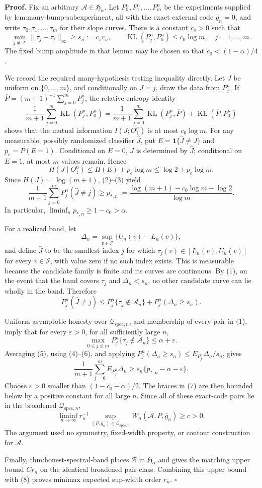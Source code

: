 \textbf{Proof.}
Fix an arbitrary \(\mathcal A\in\mathfrak H_\alpha\).  Let \(P_0^n,P_1^n,\ldots,P_m^n\) be the experiments supplied by \(\text{lem:many-bump-subexperiment}\), all with the exact external code \(\bar g_n=0\), and write \(\tau_0,\tau_1,\ldots,\tau_m\) for their slope curves.  There is a constant \(c_s>0\) such that
\[
 \min_{j\ne\ell}\|\tau_j-\tau_\ell\|_\infty
 \ge s_n:=c_sr_n, \qquad
 \operatorname{KL}(P_j^n,P_0^n)\le c_0\log m,
 \quad j=1,\ldots,m. \tag{1}
\]
The fixed bump amplitude in that lemma may be chosen so that \(c_0<(1-\alpha)/4\).

We record the required many-hypothesis testing inequality directly.  Let \(J\) be uniform on \(\{0,\ldots,m\}\), and conditionally on \(J=j\), draw the data from \(P_j^n\).  If \(\overline P=(m+1)^{-1}\sum_{j=0}^mP_j^n\), the relative-entropy identity
\[
 \frac1{m+1}\sum_{j=0}^m\operatorname{KL}(P_j^n,P_0^n)
 =\frac1{m+1}\sum_{j=0}^m\operatorname{KL}(P_j^n,\overline P)
 +\operatorname{KL}(\overline P,P_0^n) \tag{2}
\]
shows that the mutual information \(I(J;O_1^n)\) is at most \(c_0\log m\).  For any measurable, possibly randomized classifier \(\widehat J\), put \(E=\mathbf 1\{\widehat J\ne J\}\) and \(p_e=P(E=1)\).  Conditional on \(E=0\), \(J\) is determined by \(\widehat J\); conditional on \(E=1\), at most \(m\) values remain.  Hence
\[
 H(J\mid O_1^n)
 \le H(E)+p_e\log m
 \le\log2+p_e\log m. \tag{3}
\]
Since \(H(J)=\log(m+1)\), (2)--(3) yield
\[
 \frac1{m+1}\sum_{j=0}^mP_j^n(\widehat J\ne j)
 \ge p_{*,n}:=\frac{\log(m+1)-c_0\log m-\log2}{\log m}. \tag{4}
\]
In particular, \(\liminf_np_{*,n}\ge1-c_0>\alpha\).

For a realized band, let
\[
 \Delta_n=\sup_{v\in\mathcal I}\{U_n(v)-L_n(v)\},
\]
and define \(\widehat J\) to be the smallest index \(j\) for which \(\tau_j(v)\in[L_n(v),U_n(v)]\) for every \(v\in\mathcal I\), with value zero if no such index exists.  This is measurable because the candidate family is finite and its curves are continuous.  By (1), on the event that the band covers \(\tau_j\) and \(\Delta_n<s_n\), no other candidate curve can lie wholly in the band.  Therefore
\[
 P_j^n(\widehat J\ne j)
 \le P_j^n\{\tau_j\notin\mathcal A_n\}
 +P_j^n(\Delta_n\ge s_n). \tag{5}
\]

Uniform asymptotic honesty over \(\mathcal Q_{\mathrm{spec},n}\), and membership of every pair in (1), imply that for every \(\varepsilon>0\), for all sufficiently large \(n\),
\[
 \max_{0\le j\le m}P_j^n\{\tau_j\notin\mathcal A_n\}
 \le\alpha+\varepsilon. \tag{6}
\]
Averaging (5), using (4)--(6), and applying
\(P_j^n(\Delta_n\ge s_n)\le E_{P_j^n}\Delta_n/s_n\), gives
\[
 \frac1{m+1}\sum_{j=0}^mE_{P_j^n}\Delta_n
 \ge s_n\{p_{*,n}-\alpha-\varepsilon\}. \tag{7}
\]
Choose \(\varepsilon>0\) smaller than \((1-c_0-\alpha)/2\).  The braces in (7) are then bounded below by a positive constant for all large \(n\).  Since all of these exact-code pairs lie in the broadened \(\mathcal Q_{\mathrm{spec},n}\),
\[
 \liminf_{n\to\infty}r_n^{-1}
 \sup_{(P,\bar g_n)\in\mathcal Q_{\mathrm{spec},n}}
 W_n(\mathcal A,P,\bar g_n)\ge c>0. \tag{8}
\]
The argument used no symmetry, fixed-width property, or contour construction for \(\mathcal A\).

Finally, \(\text{thm:honest-spectral-band}\) places \(\mathcal B\) in \(\mathfrak H_\alpha\) and gives the matching upper bound \(Cr_n\) on the identical broadened pair class.  Combining this upper bound with (8) proves minimax expected sup-width order \(r_n\). \(\square\)